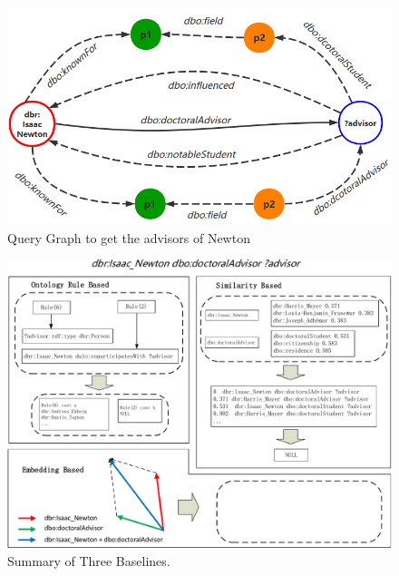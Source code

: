 \documentclass[runningheads]{llncs}
\begin{document}
\begin{figure}
\includegraphics[width=\textwidth]{Newton.png}
\caption{Query Graph to get the advisors of Newton} \label{Newton_fig}
\end{figure}

\begin{figure}
\includegraphics[width=\textwidth]{summary_three_cropped.pdf}
\caption{Summary of Three Baselines.} \label{summary_three}
\end{figure}



\end{document}
